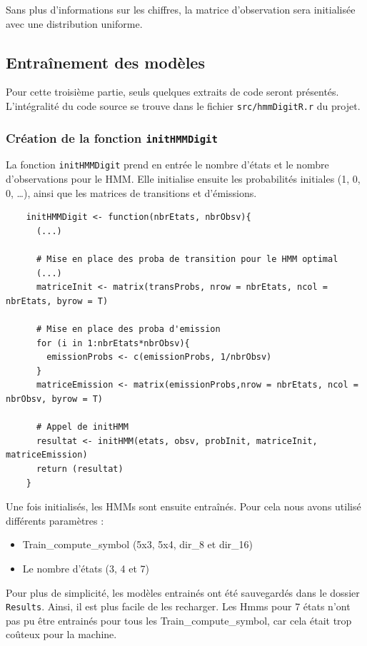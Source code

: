 Sans plus d'informations sur les chiffres, la matrice d'observation sera initialisée avec une distribution uniforme.


\subsection{Entraînement des modèles}

Pour cette troisième partie, seuls quelques extraits de code seront présentés. L'intégralité du code source se trouve dans le fichier \texttt{src/hmmDigitR.r} du projet. 

\subsubsection*{Création de la fonction \texttt{initHMMDigit}}
La fonction \texttt{initHMMDigit} prend en entrée le nombre d'états et le nombre d'observations pour le HMM. Elle initialise ensuite les probabilités initiales (1, 0, 0, \dots), ainsi que les matrices de transitions et d'émissions.\\

\newpage

\begin{lstlisting}
	initHMMDigit <- function(nbrEtats, nbrObsv){
	  (...)
		
	  # Mise en place des proba de transition pour le HMM optimal
	  (...)
	  matriceInit <- matrix(transProbs, nrow = nbrEtats, ncol = nbrEtats, byrow = T)
	  
	  # Mise en place des proba d'emission
	  for (i in 1:nbrEtats*nbrObsv){
		emissionProbs <- c(emissionProbs, 1/nbrObsv)
	  }
	  matriceEmission <- matrix(emissionProbs,nrow = nbrEtats, ncol = nbrObsv, byrow = T)
	  
	  # Appel de initHMM
	  resultat <- initHMM(etats, obsv, probInit, matriceInit, matriceEmission)
	  return (resultat)
	}
\end{lstlisting}

Une fois initialisés, les HMMs sont ensuite entraînés. Pour cela nous avons utilisé différents paramètres :
\begin{itemize}
	\item Train\_compute\_symbol (5x3, 5x4, dir\_8 et dir\_16)
	\item Le nombre d'états (3, 4 et 7)
\end{itemize}

\vspace{0.5cm}

Pour plus de simplicité, les modèles entrainés ont été sauvegardés dans le dossier \texttt{Results}. Ainsi, il est plus facile de les recharger. Les Hmms pour 7 états n'ont pas pu être entrainés pour tous les Train\_compute\_symbol, car cela était trop coûteux pour la machine.


